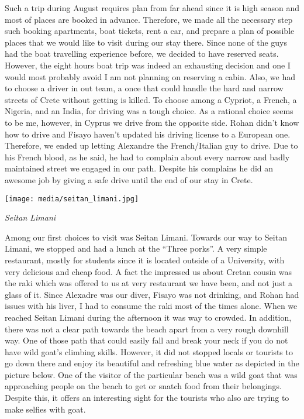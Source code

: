 \documentclass[10pt,a4paper]{article} %
\begin{document}
\begin{multicols}{3}
Such a trip during August requires plan from far ahead since it is high season 
and most of places are booked in advance. 
Therefore, we made all the necessary step such booking apartments, boat tickets, 
rent a car, and prepare a plan of possible places that we would like to visit 
during our stay there. 
Since none of the guys had the boat travelling experience before, we decided 
to have reserved seats. 
However, the eight hours boat trip was indeed an exhausting decision and one 
I would most probably avoid I am not planning on reserving a cabin.  
Also, we had to choose a driver in out team, a once that could handle the 
hard and narrow streets of Crete without getting is killed. 
To choose among a Cypriot, a French, a Nigeria, and an India, for driving 
was a tough choice. 
As a rational choice seems to be me, however, in Cyprus we drive from the 
opposite side. 
Rohan didn't know how to drive and Fisayo haven't updated his driving license 
to a European one. 
Therefore, we ended up letting Alexandre the French/Italian guy to drive. 
Due to his French blood, as he said, he had to complain about every narrow and 
badly maintained street we engaged in our path. 
Despite his complains he did an awesome job by giving a safe drive 
until the end of our stay in Crete. 

\begin{center}
	\texttt{[image: media/seitan\_limani.jpg]}
	\par\textit{Seitan Limani}
\end{center}

Among our first choices to visit was Seitan Limani. 
Towards our way to Seitan Limani, we stopped and had a lunch at the 
``Three porks''. 
A very simple restaurant, mostly for students since it is located outside 
of a University, with very delicious and cheap food. 
A fact the impressed us about Cretan cousin was the raki which was offered to us 
at very restaurant we have been, and not just a glass of it. 
Since Alexadre was our diver, Fisayo was not drinking, and Rohan had issues with his 
liver, I had to consume the raki most of the times alone. 
When we reached Seitan Limani during the afternoon it was way to crowded. 
In addition, there was not a clear path towards the beach apart from a very 
rough downhill way. 
One of those path that could easily fall and break your neck if you do not have 
wild goat's climbing skills. 
However, it did not stopped locals or tourists to go down there and enjoy its 
beautiful and refreshing blue water as depicted in the picture below. 
One of the visitor of the particular beach was a wild goat that was approaching 
people on the beach to get or snatch food from their belongings. 
Despite this, it offers an interesting sight for the tourists who also are trying 
to make selfies with goat.   


\end{multicols}
\end{document}
